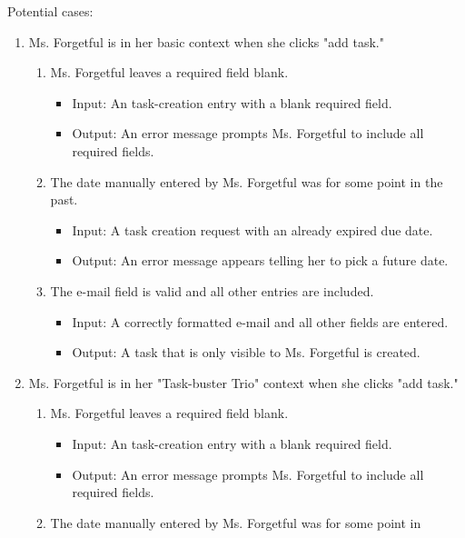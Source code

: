 \documentclass{article}
\begin{document}
Potential cases:
\begin{enumerate}
    \item Ms. Forgetful is in her basic context when she clicks "add task."
    \begin{enumerate}
        \item Ms. Forgetful leaves a required field blank.
            \begin{itemize}
                \item Input: An task-creation entry with a blank required
field.
                \item Output: An error message prompts Ms. Forgetful to
include all required fields.
            \end{itemize}
        \item The date manually entered by Ms. Forgetful was for some point in
the past.
            \begin{itemize}
                \item Input: A task creation request with an already expired
due date.
                \item Output: An error message appears telling her to pick a
future date.
            \end{itemize}
        \item The e-mail field is valid and all other entries are included.
            \begin{itemize}
                \item Input: A correctly formatted e-mail and all other fields
are entered.
                \item Output: A task that is only visible to Ms. Forgetful is
created.
            \end{itemize}
    \end{enumerate}
\item Ms. Forgetful is in her "Task-buster Trio" context when she clicks "add
task."
     \begin{enumerate}
        \item Ms. Forgetful leaves a required field blank.
            \begin{itemize}
                \item Input: An task-creation entry with a blank required
field.
                \item Output: An error message prompts Ms. Forgetful to
include all required fields.
            \end{itemize}
        \item The date manually entered by Ms. Forgetful was for some point in

\end{enumerate}
\end{enumerate}
\end{document}
